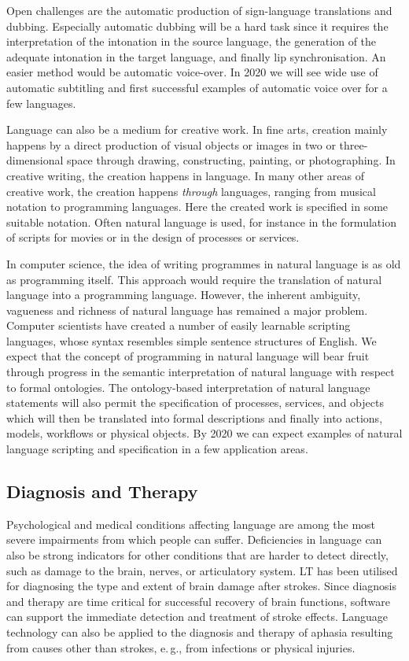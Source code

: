 \documentclass[10pt, plain]{../../metanetpaper}
\begin{document}
\begin{multicols}{2}
Open challenges are the automatic production of sign-language translations and dubbing. Especially automatic dubbing will be a hard task since it requires the interpretation of the intonation in the source language, the generation of the adequate intonation in the target language, and finally lip synchronisation. An easier method would be automatic voice-over. In 2020 we will see wide use of automatic subtitling and first successful examples of automatic voice over for a few languages.
 
Language can also be a medium for creative work. In fine arts, creation mainly happens by a direct production of visual objects or images in two or three-dimensional space through drawing, constructing, painting, or photographing. In creative writing, the creation happens in language. In many other areas of creative work, the creation happens \emph{through} languages, ranging from musical notation to programming languages. Here the created work is specified in some suitable notation. Often natural language is used, for instance in the formulation of scripts for movies or in the design of processes or services.

In computer science, the idea of writing programmes in natural language is as old as programming itself. This approach would require the translation of natural language into a programming language. However, the inherent ambiguity, vagueness and richness of natural language has remained a major problem. Computer scientists have created a number of easily learnable scripting languages, whose syntax resembles simple sentence structures of English. We expect that the concept of programming in natural language will bear fruit through progress in the semantic interpretation of natural language with respect to formal ontologies.  The ontology-based interpretation of natural language statements will also permit the specification of processes, services, and objects which will then be translated into formal descriptions and finally into actions, models, workflows or physical objects. By 2020 we can expect examples of natural language scripting and specification in a few application areas.

\subsection{Diagnosis and Therapy}
\label{sec:diagnosis-therapy}

Psychological and medical conditions affecting language are among the most severe impairments from which people can suffer. Deficiencies in language can also be strong indicators for other conditions that are harder to detect directly, such as damage to the brain, nerves, or articulatory system. LT has been utilised for diagnosing the type and extent of brain damage after strokes. Since diagnosis and therapy are time critical for successful recovery of brain functions, software can support the immediate detection and treatment of stroke effects. Language technology can also be applied to the diagnosis and therapy of aphasia resulting from causes other than strokes, e.\,g., from infections or physical injuries.


\end{multicols}
\end{document}
